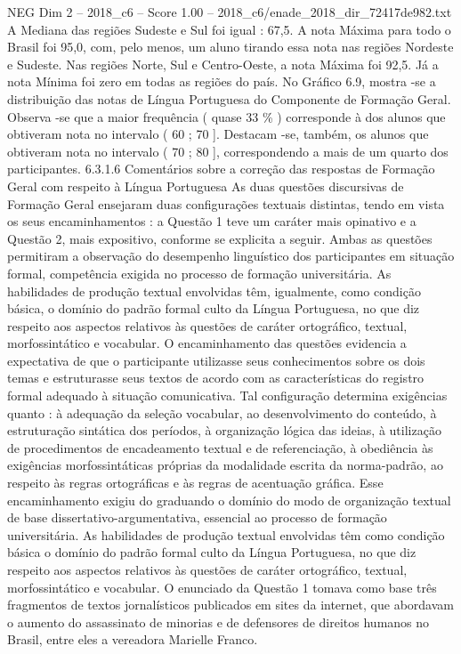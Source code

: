 \begin{textsample}{NEG Dim 2 – 2018\_c6 – Score 1.00 – 2018\_c6/enade\_2018\_dir\_72417de982.txt}
A Mediana das regiões Sudeste e Sul foi igual : 67,5.
A nota Máxima para todo o Brasil foi 95,0, com, pelo menos, um aluno tirando essa nota nas regiões Nordeste e Sudeste.
Nas regiões Norte, Sul e Centro-Oeste, a nota Máxima foi 92,5.
Já a nota Mínima foi zero em todas as regiões do país.
No Gráfico 6.9, mostra -se a distribuição das notas de Língua Portuguesa do Componente de Formação Geral.
Observa -se que a maior frequência ( quase 33 \% ) corresponde à dos alunos que obtiveram nota no intervalo ( 60 ; 70 ].
Destacam -se, também, os alunos que obtiveram nota no intervalo ( 70 ; 80 ], correspondendo a mais de um quarto dos participantes. 6.3.1.6 Comentários sobre a correção das respostas de Formação Geral com respeito à Língua Portuguesa As duas questões discursivas de Formação Geral ensejaram duas configurações textuais distintas, tendo em vista os seus encaminhamentos : a Questão 1 teve um caráter mais opinativo e a Questão 2, mais expositivo, conforme se explicita a seguir.
Ambas as questões permitiram a observação do desempenho linguístico dos participantes em situação formal, competência exigida no processo de formação universitária.
As habilidades de produção textual envolvidas têm, igualmente, como condição básica, o domínio do padrão formal culto da Língua Portuguesa, no que diz respeito aos aspectos relativos às questões de caráter ortográfico, textual, morfossintático e vocabular.
O encaminhamento das questões evidencia a expectativa de que o participante utilizasse seus conhecimentos sobre os dois temas e estruturasse seus textos de acordo com as características do registro formal adequado à situação comunicativa.
Tal configuração determina exigências quanto : à adequação da seleção vocabular, ao desenvolvimento do conteúdo, à estruturação sintática dos períodos, à organização lógica das ideias, à utilização de procedimentos de encadeamento textual e de referenciação, à obediência às exigências morfossintáticas próprias da modalidade escrita da norma-padrão, ao respeito às regras ortográficas e às regras de acentuação gráfica.
Esse encaminhamento exigiu do graduando o domínio do modo de organização textual de base dissertativo-argumentativa, essencial ao processo de formação universitária.
As habilidades de produção textual envolvidas têm como condição básica o domínio do padrão formal culto da Língua Portuguesa, no que diz respeito aos aspectos relativos às questões de caráter ortográfico, textual, morfossintático e vocabular.
O enunciado da Questão 1 tomava como base três fragmentos de textos jornalísticos publicados em sites da internet, que abordavam o aumento do assassinato de minorias e de defensores de direitos humanos no Brasil, entre eles a vereadora Marielle Franco.

\end{textsample}
